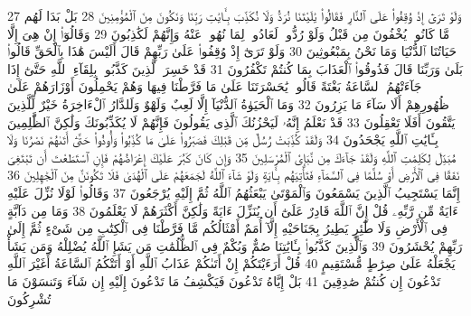 {\tiny\colorbox{cl_aya}{27}} وَلَوْ تَرَىٰٓ إِذْ وُقِفُوا۟ عَلَى ٱلنَّارِ فَقَالُوا۟ يَٰلَيْتَنَا نُرَدُّ وَلَا نُكَذِّبَ بِـَٔايَٰتِ رَبِّنَا وَنَكُونَ مِنَ ٱلْمُؤْمِنِينَ
{\tiny\colorbox{cl_aya}{28}} بَلْ بَدَا لَهُم مَّا كَانُوا۟ يُخْفُونَ مِن قَبْلُ وَلَوْ رُدُّوا۟ لَعَادُوا۟ لِمَا نُهُوا۟ عَنْهُ وَإِنَّهُمْ لَكَٰذِبُونَ
{\tiny\colorbox{cl_aya}{29}} وَقَالُوٓا۟ إِنْ هِىَ إِلَّا حَيَاتُنَا ٱلدُّنْيَا وَمَا نَحْنُ بِمَبْعُوثِينَ
{\tiny\colorbox{cl_aya}{30}} وَلَوْ تَرَىٰٓ إِذْ وُقِفُوا۟ عَلَىٰ رَبِّهِمْ قَالَ أَلَيْسَ هَٰذَا بِٱلْحَقِّ قَالُوا۟ بَلَىٰ وَرَبِّنَا قَالَ فَذُوقُوا۟ ٱلْعَذَابَ بِمَا كُنتُمْ تَكْفُرُونَ
{\tiny\colorbox{cl_aya}{31}} قَدْ خَسِرَ ٱلَّذِينَ كَذَّبُوا۟ بِلِقَآءِ ٱللَّهِ حَتَّىٰٓ إِذَا جَآءَتْهُمُ ٱلسَّاعَةُ بَغْتَةً قَالُوا۟ يَٰحَسْرَتَنَا عَلَىٰ مَا فَرَّطْنَا فِيهَا وَهُمْ يَحْمِلُونَ أَوْزَارَهُمْ عَلَىٰ ظُهُورِهِمْ أَلَا سَآءَ مَا يَزِرُونَ
{\tiny\colorbox{cl_aya}{32}} وَمَا ٱلْحَيَوٰةُ ٱلدُّنْيَآ إِلَّا لَعِبٌ وَلَهْوٌ وَلَلدَّارُ ٱلْءَاخِرَةُ خَيْرٌ لِّلَّذِينَ يَتَّقُونَ أَفَلَا تَعْقِلُونَ
{\tiny\colorbox{cl_aya}{33}} قَدْ نَعْلَمُ إِنَّهُۥ لَيَحْزُنُكَ ٱلَّذِى يَقُولُونَ فَإِنَّهُمْ لَا يُكَذِّبُونَكَ وَلَٰكِنَّ ٱلظَّٰلِمِينَ بِـَٔايَٰتِ ٱللَّهِ يَجْحَدُونَ
{\tiny\colorbox{cl_aya}{34}} وَلَقَدْ كُذِّبَتْ رُسُلٌ مِّن قَبْلِكَ فَصَبَرُوا۟ عَلَىٰ مَا كُذِّبُوا۟ وَأُوذُوا۟ حَتَّىٰٓ أَتَىٰهُمْ نَصْرُنَا وَلَا مُبَدِّلَ لِكَلِمَٰتِ ٱللَّهِ وَلَقَدْ جَآءَكَ مِن نَّبَإِى۟ ٱلْمُرْسَلِينَ
{\tiny\colorbox{cl_aya}{35}} وَإِن كَانَ كَبُرَ عَلَيْكَ إِعْرَاضُهُمْ فَإِنِ ٱسْتَطَعْتَ أَن تَبْتَغِىَ نَفَقًا فِى ٱلْأَرْضِ أَوْ سُلَّمًا فِى ٱلسَّمَآءِ فَتَأْتِيَهُم بِـَٔايَةٍ وَلَوْ شَآءَ ٱللَّهُ لَجَمَعَهُمْ عَلَى ٱلْهُدَىٰ فَلَا تَكُونَنَّ مِنَ ٱلْجَٰهِلِينَ
{\tiny\colorbox{cl_aya}{36}} إِنَّمَا يَسْتَجِيبُ ٱلَّذِينَ يَسْمَعُونَ وَٱلْمَوْتَىٰ يَبْعَثُهُمُ ٱللَّهُ ثُمَّ إِلَيْهِ يُرْجَعُونَ
{\tiny\colorbox{cl_aya}{37}} وَقَالُوا۟ لَوْلَا نُزِّلَ عَلَيْهِ ءَايَةٌ مِّن رَّبِّهِۦ قُلْ إِنَّ ٱللَّهَ قَادِرٌ عَلَىٰٓ أَن يُنَزِّلَ ءَايَةً وَلَٰكِنَّ أَكْثَرَهُمْ لَا يَعْلَمُونَ
{\tiny\colorbox{cl_aya}{38}} وَمَا مِن دَآبَّةٍ فِى ٱلْأَرْضِ وَلَا طَٰٓئِرٍ يَطِيرُ بِجَنَاحَيْهِ إِلَّآ أُمَمٌ أَمْثَالُكُم مَّا فَرَّطْنَا فِى ٱلْكِتَٰبِ مِن شَىْءٍ ثُمَّ إِلَىٰ رَبِّهِمْ يُحْشَرُونَ
{\tiny\colorbox{cl_aya}{39}} وَٱلَّذِينَ كَذَّبُوا۟ بِـَٔايَٰتِنَا صُمٌّ وَبُكْمٌ فِى ٱلظُّلُمَٰتِ مَن يَشَإِ ٱللَّهُ يُضْلِلْهُ وَمَن يَشَأْ يَجْعَلْهُ عَلَىٰ صِرَٰطٍ مُّسْتَقِيمٍ
{\tiny\colorbox{cl_aya}{40}} قُلْ أَرَءَيْتَكُمْ إِنْ أَتَىٰكُمْ عَذَابُ ٱللَّهِ أَوْ أَتَتْكُمُ ٱلسَّاعَةُ أَغَيْرَ ٱللَّهِ تَدْعُونَ إِن كُنتُمْ صَٰدِقِينَ
{\tiny\colorbox{cl_aya}{41}} بَلْ إِيَّاهُ تَدْعُونَ فَيَكْشِفُ مَا تَدْعُونَ إِلَيْهِ إِن شَآءَ وَتَنسَوْنَ مَا تُشْرِكُونَ
